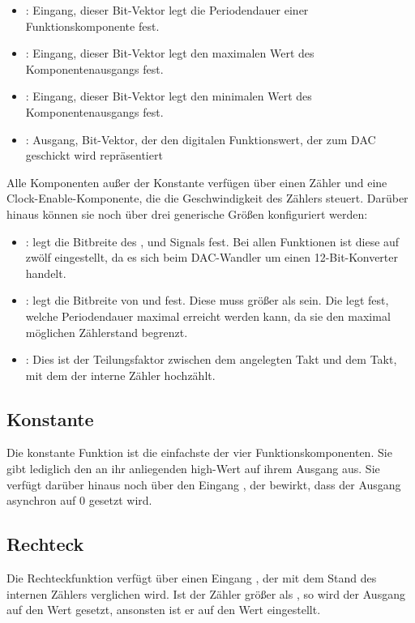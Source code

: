 \begin{itemize}
\item {}: Eingang, dieser Bit-Vektor legt die Periodendauer einer Funktionskomponente fest.
\item {}: Eingang, dieser Bit-Vektor legt den maximalen Wert des Komponentenausgangs fest.
\item {}: Eingang, dieser Bit-Vektor legt den minimalen Wert des Komponentenausgangs fest.
\item {}: Ausgang, Bit-Vektor, der den digitalen Funktionswert, der zum DAC geschickt wird repräsentiert
\end{itemize}

Alle Komponenten außer der Konstante verfügen über einen Zähler und eine Clock-Enable-Komponente, die die Geschwindigkeit des Zählers steuert.
Darüber hinaus können sie noch über drei generische Größen konfiguriert werden:

\begin{itemize}
\item {}: legt die Bitbreite des ,  und  Signals fest.
Bei allen Funktionen ist diese auf zwölf eingestellt, da es sich beim DAC-Wandler um einen 12-Bit-Konverter handelt.
\item {}: legt die Bitbreite von  und  fest.
  Diese muss größer als  sein.
  Die  legt fest, welche Periodendauer maximal erreicht werden kann, da sie den maximal möglichen Zählerstand begrenzt.
\item {}: Dies ist der Teilungsfaktor zwischen dem angelegten Takt und dem Takt, mit dem der interne Zähler hochzählt.
\end{itemize}


\subsection{Konstante}   \label{Comp:Func:Const}
Die konstante Funktion ist die einfachste der vier Funktionskomponenten.
Sie gibt lediglich den an ihr anliegenden high-Wert auf ihrem Ausgang aus.
Sie verfügt darüber hinaus noch über den Eingang , der bewirkt, dass der Ausgang asynchron auf 0 gesetzt wird.

\subsection{Rechteck}   \label{Comp:Func:Square}
Die Rechteckfunktion verfügt über einen Eingang , der mit dem Stand des internen Zählers verglichen wird.
Ist der Zähler größer als , so wird der Ausgang auf den Wert  gesetzt, ansonsten ist er auf den Wert  eingestellt.

